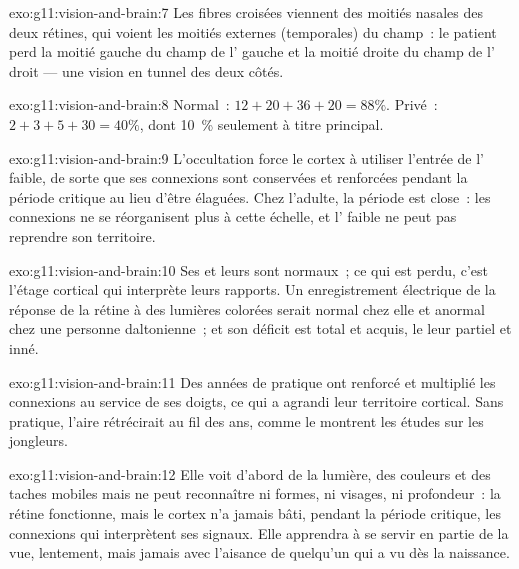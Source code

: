\begin{solution}{exo:g11:vision-and-brain:7}
Les fibres croisées viennent des moitiés nasales des deux rétines, qui
voient les moitiés externes (temporales) du champ~: le patient perd la
moitié gauche du champ de l' gauche et la moitié droite du champ de
l' droit --- une vision en tunnel des deux côtés.
\end{solution}

\begin{solution}{exo:g11:vision-and-brain:8}
Normal~: $12 + 20 + 36 + 20 = 88\%$. Privé~: $2 + 3 + 5 + 30 = 40\%$,
dont 10~\% seulement à titre principal.
\end{solution}

\begin{solution}{exo:g11:vision-and-brain:9}
L'occultation force le cortex à utiliser l'entrée de l' faible, de
sorte que ses connexions sont conservées et renforcées pendant la
période critique au lieu d'être élaguées. Chez l'adulte, la période est
close~: les connexions ne se réorganisent plus à cette échelle, et
l' faible ne peut pas reprendre son territoire.
\end{solution}

\begin{solution}{exo:g11:vision-and-brain:10}
Ses  et leurs  sont normaux~; ce qui est perdu, c'est
l'étage cortical qui interprète leurs rapports. Un enregistrement
électrique de la réponse de la rétine à des lumières colorées serait
normal chez elle et anormal chez une personne daltonienne~; et son
déficit est total et acquis, le leur partiel et inné.
\end{solution}

\begin{solution}{exo:g11:vision-and-brain:11}
Des années de pratique ont renforcé et multiplié les connexions au
service de ses doigts, ce qui a agrandi leur territoire cortical. Sans
pratique, l'aire rétrécirait au fil des ans, comme le montrent les
études sur les jongleurs.
\end{solution}

\begin{solution}{exo:g11:vision-and-brain:12}
Elle voit d'abord de la lumière, des couleurs et des taches mobiles
mais ne peut reconnaître ni formes, ni visages, ni profondeur~: la
rétine fonctionne, mais le cortex n'a jamais bâti, pendant la période
critique, les connexions qui interprètent ses signaux. Elle apprendra à
se servir en partie de la vue, lentement, mais jamais avec l'aisance de
quelqu'un qui a vu dès la naissance.
\end{solution}

